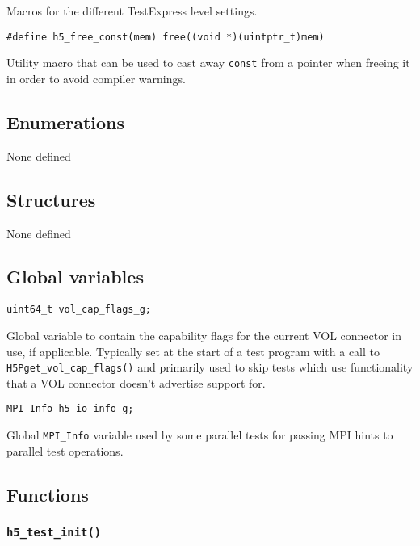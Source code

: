 \documentclass[../HDF5_RFC.tex]{subfiles}
\begin{document}
Macros for the different TestExpress level settings.

\begin{verbatim}
#define h5_free_const(mem) free((void *)(uintptr_t)mem)
\end{verbatim}

Utility macro that can be used to cast away \texttt{const} from a pointer when freeing it in
order to avoid compiler warnings.

\subsection{Enumerations}

None defined

\subsection{Structures}

None defined

\subsection{Global variables}

\begin{verbatim}
uint64_t vol_cap_flags_g;
\end{verbatim}

Global variable to contain the capability flags for the current VOL connector in use, if applicable.
Typically set at the start of a test program with a call to \texttt{H5Pget\_vol\_cap\_flags()} and
primarily used to skip tests which use functionality that a VOL connector doesn't advertise support
for.

\begin{verbatim}
MPI_Info h5_io_info_g;
\end{verbatim}

Global \texttt{MPI\_Info} variable used by some parallel tests for passing MPI hints to parallel
test operations.

\subsection{Functions}

\subsubsection{\texttt{h5\_test\_init()}}
\label{apdx:h5test_h5testinit}
\end{document}
